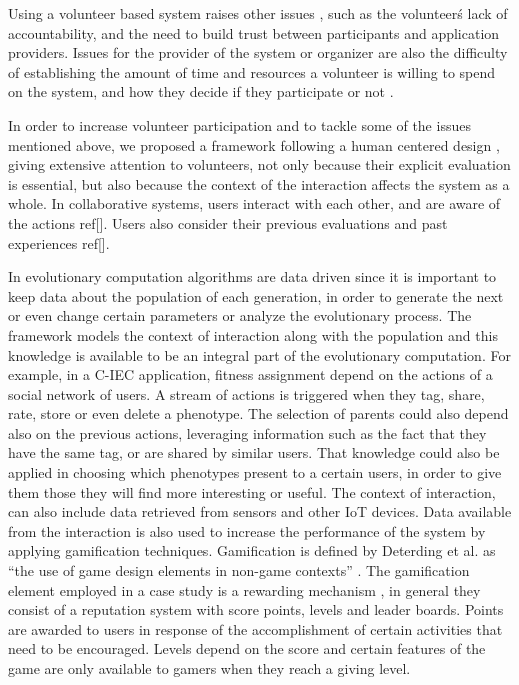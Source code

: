 Using a volunteer based system raises other issues \cite{sarmenta2001volunteer,web:BOINC}, 
such as the volunteer\'s lack of accountability,
and the need to build trust between participants and application
providers. Issues for the provider of the system or organizer  are also the difficulty of establishing 
the amount of time and resources
a volunteer is willing to spend on the system, and how they decide if they
participate or not \cite{JJ:2016}. 

In order to increase volunteer participation and to tackle some of the issues mentioned above,  
we proposed a framework following a human centered design \cite{greenhouse2012human},
giving extensive attention to volunteers, not only because their
explicit evaluation is essential, but also because the context of the 
interaction affects the system as a whole. In collaborative systems, users interact 
with each other, and are aware of the actions ref[]. Users also consider their previous evaluations
and past experiences ref[].

In evolutionary computation algorithms are data driven since it is important to keep data about the 
population of each generation, in order to generate the next or even change certain parameters
or analyze the evolutionary process. 
The framework models the context of interaction along with the population and
this knowledge is available to be an integral part of the evolutionary computation.
For example, in a C-IEC application, fitness assignment depend on the
actions of a social network of users. 
A stream of actions is triggered when they tag, share, rate, store or even delete a phenotype. 
The selection of parents could also depend also on the previous actions, leveraging information 
such as the fact that they have the same tag, or are shared by
similar users. That knowledge could also be applied in choosing which phenotypes present to a certain
users, in order to give them those they will find more interesting or useful. 
The context of interaction, can also include data retrieved from sensors and other IoT devices.
Data available from the interaction is also used to increase the performance of the system by applying 
gamification techniques. Gamification is defined by Deterding et al. as
``the use of game design elements in non-game contexts'' \cite{deterding2011game}.
The gamification element employed in a case study is a rewarding mechanism  
\cite{dubois2013understanding}, in general they consist of a reputation system with score points, 
levels and leader boards. Points are awarded to users in response of 
the accomplishment of certain activities that need to be encouraged. Levels depend
on the score and certain features of the game are only available to gamers when 
they reach a giving level.

